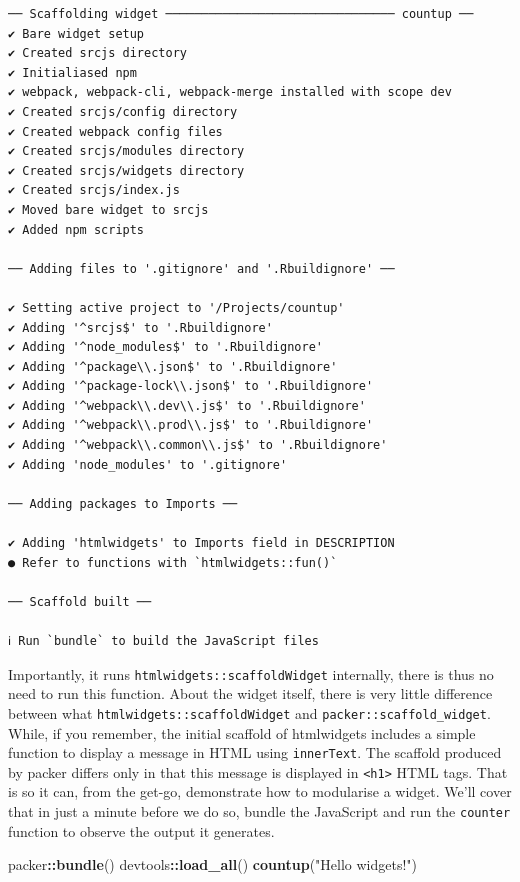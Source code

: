 \documentclass[
  10pt,
]{krantz}
\makeatletter
\newenvironment{Shaded}{\begin{snugshade}}{\end{snugshade}}
\newcommand{\KeywordTok}[1]{\textcolor[rgb]{0.27,0.27,0.27}{\textbf{#1}}}
\newcommand{\NormalTok}[1]{#1}
\newcommand{\OperatorTok}[1]{\textcolor[rgb]{0.43,0.43,0.43}{\textbf{#1}}}
\newcommand{\StringTok}[1]{\textcolor[rgb]{0.5,0.5,0.5}{#1}}
\newenvironment{kframe}{%
\medskip{}
\setlength{\fboxsep}{.8em}
 \def\at@end@of@kframe{}%
 \ifinner\ifhmode%
  \def\at@end@of@kframe{\end{minipage}}%
  \begin{minipage}{\columnwidth}%
 \fi\fi%
 \def\FrameCommand##1{\hskip\@totalleftmargin \hskip-\fboxsep
 \colorbox{shadecolor}{##1}\hskip-\fboxsep
     \hskip-\linewidth \hskip-\@totalleftmargin \hskip\columnwidth}%
 \MakeFramed {\advance\hsize-\width
   \@totalleftmargin\z@ \linewidth\hsize
   \@setminipage}}%
 {\par\unskip\endMakeFramed%
 \at@end@of@kframe}
\renewenvironment{Shaded}{\begin{kframe}}{\end{kframe}}
\makeatother
\begin{document}
\begin{verbatim}
── Scaffolding widget ──────────────────────────────── countup ── 
✔ Bare widget setup
✔ Created srcjs directory
✔ Initialiased npm
✔ webpack, webpack-cli, webpack-merge installed with scope dev
✔ Created srcjs/config directory
✔ Created webpack config files
✔ Created srcjs/modules directory
✔ Created srcjs/widgets directory
✔ Created srcjs/index.js
✔ Moved bare widget to srcjs
✔ Added npm scripts

── Adding files to '.gitignore' and '.Rbuildignore' ──

✔ Setting active project to '/Projects/countup'
✔ Adding '^srcjs$' to '.Rbuildignore'
✔ Adding '^node_modules$' to '.Rbuildignore'
✔ Adding '^package\\.json$' to '.Rbuildignore'
✔ Adding '^package-lock\\.json$' to '.Rbuildignore'
✔ Adding '^webpack\\.dev\\.js$' to '.Rbuildignore'
✔ Adding '^webpack\\.prod\\.js$' to '.Rbuildignore'
✔ Adding '^webpack\\.common\\.js$' to '.Rbuildignore'
✔ Adding 'node_modules' to '.gitignore'

── Adding packages to Imports ──

✔ Adding 'htmlwidgets' to Imports field in DESCRIPTION
● Refer to functions with `htmlwidgets::fun()`

── Scaffold built ──

ℹ Run `bundle` to build the JavaScript files
\end{verbatim}

Importantly, it runs \texttt{htmlwidgets::scaffoldWidget} internally, there is thus no need to run this function. About the widget itself, there is very little difference between what \texttt{htmlwidgets::scaffoldWidget} and \texttt{packer::scaffold\_widget}. While, if you remember, the initial scaffold of htmlwidgets includes a simple function to display a message in HTML using \texttt{innerText}. The scaffold produced by packer differs only in that this message is displayed in \texttt{\textless{}h1\textgreater{}} HTML tags. That is so it can, from the get-go, demonstrate how to modularise a widget. We'll cover that in just a minute before we do so, bundle the JavaScript and run the \texttt{counter} function to observe the output it generates.

\begin{Shaded}
\begin{Highlighting}[]
\NormalTok{packer}\OperatorTok{::}\KeywordTok{bundle}\NormalTok{()}
\NormalTok{devtools}\OperatorTok{::}\KeywordTok{load\_all}\NormalTok{()}
\KeywordTok{countup}\NormalTok{(}\StringTok{"Hello widgets!"}\NormalTok{)}
\end{Highlighting}
\end{Shaded}
\end{document}
